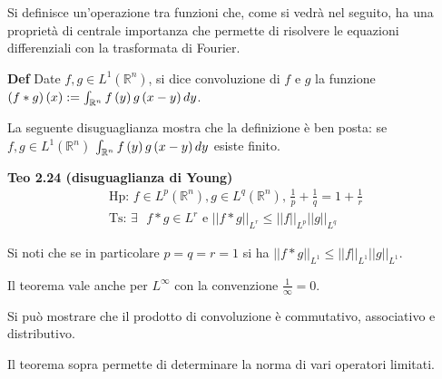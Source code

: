 \documentclass{article}
\begin{document}
Si definisce un'operazione tra funzioni che, come si vedr\`{a} nel seguito,
ha una propriet\`{a} di centrale importanza che permette di risolvere le
equazioni differenziali con la trasformata di Fourier.

\textbf{Def} Date $f,g\in L^{1}\left( 
\mathbb{R}
^{n}\right) $, si dice convoluzione di $f$ e $g$ la funzione $\left( f\ast
g\right) \left( x\right) :=\int_{%
\mathbb{R}
^{n}}f\left( y\right) g\left( x-y\right) dy$.

La seguente disuguaglianza mostra che la definizione \`{e} ben posta: se $%
f,g\in L^{1}\left( 
\mathbb{R}
^{n}\right) $ $\int_{%
\mathbb{R}
^{n}}f\left( y\right) g\left( x-y\right) dy$ esiste finito.

\textbf{Teo 2.24 (disuguaglianza di Young)}%
\begin{gather*}
\text{Hp}\text{: }f\in L^{p}\left( 
\mathbb{R}
^{n}\right) ,g\in L^{q}\left( 
\mathbb{R}
^{n}\right) \text{, }\frac{1}{p}+\frac{1}{q}=1+\frac{1}{r} \\
\text{Ts}\text{: }\exists \text{ }f\ast g\in L^{r}\text{ e }\left\vert
\left\vert f\ast g\right\vert \right\vert _{L^{r}}\leq \left\vert \left\vert
f\right\vert \right\vert _{L^{p}}\left\vert \left\vert g\right\vert
\right\vert _{L^{q}}
\end{gather*}

Si noti che se in particolare $p=q=r=1$ si ha $\left\vert \left\vert f\ast
g\right\vert \right\vert _{L^{1}}\leq \left\vert \left\vert f\right\vert
\right\vert _{L^{1}}\left\vert \left\vert g\right\vert \right\vert _{L^{1}}$.

Il teorema vale anche per $L^{\infty }$ con la convenzione $\frac{1}{\infty }%
=0$.

Si pu\`{o} mostrare che il prodotto di convoluzione \`{e} commutativo,
associativo e distributivo.

Il teorema sopra permette di determinare la norma di vari operatori limitati.
\end{document}
